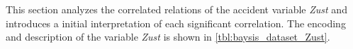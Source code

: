 This section analyzes the correlated relations of the accident variable \textit{Zust} and introduces a initial interpretation of each significant correlation. The encoding and description of the variable \textit{Zust} is shown in \cref{tbl:baysis_dataset_Zust}.

